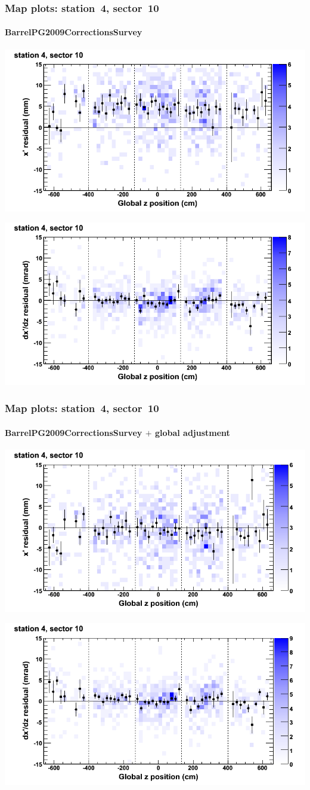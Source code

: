 \documentclass[compress]{beamer}
\begin{document}
\begin{frame}
\frametitle{Map plots: station~4, sector~10}
\framesubtitle{BarrelPG2009CorrectionsSurvey}
\includegraphics[width=0.5\linewidth]{mapplots_01/DTvsz_st4sec10_x.png}

\includegraphics[width=0.5\linewidth]{mapplots_01/DTvsz_st4sec10_dxdz.png}
\end{frame}
\begin{frame}
\frametitle{Map plots: station~4, sector~10}
\framesubtitle{BarrelPG2009CorrectionsSurvey $+$ global adjustment}
\includegraphics[width=0.5\linewidth]{mapplots_re01/DTvsz_st4sec10_x.png}

\includegraphics[width=0.5\linewidth]{mapplots_re01/DTvsz_st4sec10_dxdz.png}
\end{frame}
\end{document}
